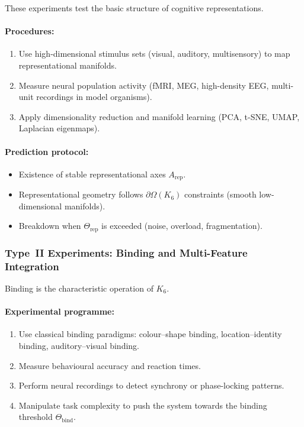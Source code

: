 These experiments test the basic structure of cognitive
representations.

\paragraph{Procedures:}

\begin{enumerate}
    \item Use high-dimensional stimulus sets (visual, auditory,
          multisensory) to map representational manifolds.
    \item Measure neural population activity (fMRI, MEG, high-density EEG,
          multi-unit recordings in model organisms).
    \item Apply dimensionality reduction and manifold learning
          (PCA, t-SNE, UMAP, Laplacian eigenmaps).
\end{enumerate}

\paragraph{Prediction protocol:}

\begin{itemize}
    \item Existence of stable representational axes $A_{\mathrm{rep}}$.
    \item Representational geometry follows $\partial\Omega(K_6)$
          constraints (smooth low-dimensional manifolds).
    \item Breakdown when $\Theta_{\mathrm{rep}}$ is exceeded
          (noise, overload, fragmentation).
\end{itemize}



\subsubsection{Type~II Experiments: Binding and Multi-Feature Integration}

Binding is the characteristic operation of $K_6$.

\paragraph{Experimental programme:}

\begin{enumerate}
    \item Use classical binding paradigms:
          colour–shape binding, location–identity binding,
          auditory–visual binding.
    \item Measure behavioural accuracy and reaction times.
    \item Perform neural recordings to detect synchrony or
          phase-locking patterns.
    \item Manipulate task complexity to push the system towards
          the binding threshold $\Theta_{\mathrm{bind}}$.
\end{enumerate}

